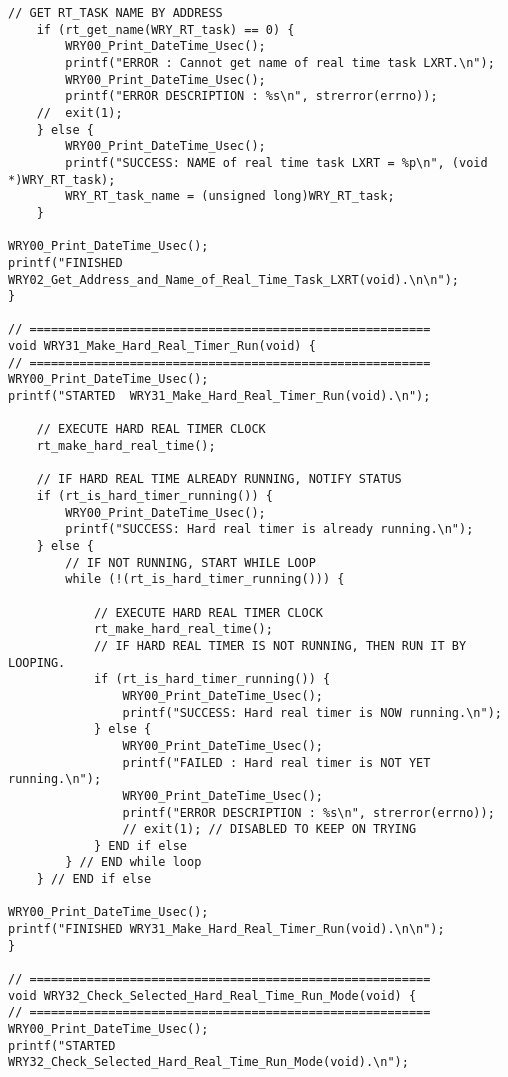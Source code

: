 \begin{lstlisting}[caption={App4-Full C-Code listing for Real Time (RTAI)}, label=App4-Full C-Code listing for Real Time (RTAI)]
	// GET RT_TASK NAME BY ADDRESS
	if (rt_get_name(WRY_RT_task) == 0) {
		WRY00_Print_DateTime_Usec();
		printf("ERROR : Cannot get name of real time task LXRT.\n");
		WRY00_Print_DateTime_Usec();
		printf("ERROR DESCRIPTION : %s\n", strerror(errno));
	//	exit(1);
	} else {
		WRY00_Print_DateTime_Usec();
		printf("SUCCESS: NAME of real time task LXRT = %p\n", (void *)WRY_RT_task);
		WRY_RT_task_name = (unsigned long)WRY_RT_task;
	}

WRY00_Print_DateTime_Usec(); 
printf("FINISHED WRY02_Get_Address_and_Name_of_Real_Time_Task_LXRT(void).\n\n");
}

// ========================================================
void WRY31_Make_Hard_Real_Timer_Run(void) {
// ========================================================
WRY00_Print_DateTime_Usec(); 
printf("STARTED  WRY31_Make_Hard_Real_Timer_Run(void).\n");

	// EXECUTE HARD REAL TIMER CLOCK
	rt_make_hard_real_time();
	
	// IF HARD REAL TIME ALREADY RUNNING, NOTIFY STATUS
	if (rt_is_hard_timer_running()) {
		WRY00_Print_DateTime_Usec();
		printf("SUCCESS: Hard real timer is already running.\n");
	} else {
		// IF NOT RUNNING, START WHILE LOOP
		while (!(rt_is_hard_timer_running())) {
	
			// EXECUTE HARD REAL TIMER CLOCK
			rt_make_hard_real_time();
			// IF HARD REAL TIMER IS NOT RUNNING, THEN RUN IT BY LOOPING.
			if (rt_is_hard_timer_running()) {
				WRY00_Print_DateTime_Usec();
				printf("SUCCESS: Hard real timer is NOW running.\n");
			} else {
				WRY00_Print_DateTime_Usec();
				printf("FAILED : Hard real timer is NOT YET running.\n");
				WRY00_Print_DateTime_Usec();
				printf("ERROR DESCRIPTION : %s\n", strerror(errno));
				// exit(1); // DISABLED TO KEEP ON TRYING
			} END if else    
		} // END while loop
	} // END if else

WRY00_Print_DateTime_Usec(); 
printf("FINISHED WRY31_Make_Hard_Real_Timer_Run(void).\n\n");
}

// ========================================================
void WRY32_Check_Selected_Hard_Real_Time_Run_Mode(void) {
// ========================================================
WRY00_Print_DateTime_Usec(); 
printf("STARTED  WRY32_Check_Selected_Hard_Real_Time_Run_Mode(void).\n");


\end{lstlisting}
